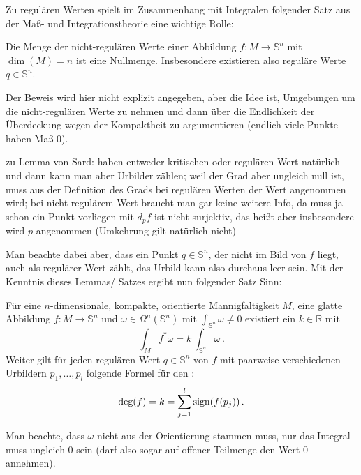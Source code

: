 \documentclass[../H_Analysis_main.tex]{subfiles}
\begin{document}
Zu regulären Werten spielt im Zusammenhang mit Integralen folgender Satz aus der Maß- und Integrationstheorie eine wichtige Rolle:
\begin{lemma}[Sard]
Die Menge der nicht-regulären Werte einer Abbildung $f: M \rightarrow \mathbb{S}^n$ mit $\dim(M) = n$ ist eine Nullmenge. Insbesondere existieren also reguläre Werte $q \in \mathbb{S}^n$.
\end{lemma}
Der Beweis wird hier nicht explizit angegeben, aber die Idee ist, Umgebungen um die nicht-regulären Werte zu nehmen und dann über die Endlichkeit der Überdeckung wegen der Kompaktheit zu argumentieren (endlich viele Punkte haben Maß 0).

zu Lemma von Sard: haben entweder kritischen oder regulären Wert natürlich und dann kann man aber Urbilder zählen; weil der Grad aber ungleich null ist, muss aus der Definition des Grads bei regulären Werten der Wert angenommen wird; bei nicht-regulärem Wert braucht man gar keine weitere Info, da muss ja schon ein Punkt vorliegen mit $d_p f$ ist nicht surjektiv, das heißt aber insbesondere wird $p$ angenommen (Umkehrung gilt natürlich nicht)

Man beachte dabei aber, dass ein Punkt $q \in \mathbb{S}^n$, der nicht im Bild von $f$ liegt, auch als regulärer Wert zählt, das Urbild kann also durchaus leer sein. Mit der Kenntnis dieses Lemmas/ Satzes ergibt nun folgender Satz Sinn:
\begin{satz}
Für eine $n$-dimensionale, kompakte, orientierte Mannigfaltigkeit $M$, eine glatte Abbildung $f: M \rightarrow \mathbb{S}^n$ und $\omega \in \Omega^n(\mathbb{S}^n)$ mit $\int_{\mathbb{S}^n} \omega \neq 0$ existiert ein $k \in \mathbb{R}$ mit
\begin{equation}
\int_M f^* \omega = k \, \int_{\mathbb{S}^n} \omega \, .
\end{equation}
Weiter gilt für jeden regulären Wert $q \in \mathbb{S}^n$ von $f$ mit paarweise verschiedenen Urbildern $p_1, \dots, p_l$ folgende Formel für den :
\begin{equation}
\text{deg}(f) = k = \sum_{j = 1}^l \text{sign}\qty(f(p_j)) \, .
\end{equation}
\end{satz}
Man beachte, dass $\omega$ nicht aus der Orientierung stammen muss, nur das Integral muss ungleich 0 sein (darf also sogar auf offener Teilmenge den Wert 0 annehmen).
\end{document}
